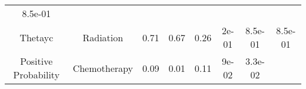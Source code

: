 \documentclass[12pt,]{article}
\begin{document}
\begin{longtable}[]{@{}cccccccc@{}}
\begin{minipage}[t]{0.08\columnwidth}
8.5e-01\strut
\end{minipage}\tabularnewline
\begin{minipage}[t]{0.12\columnwidth}\centering\strut
Thetayc\strut
\end{minipage} & \begin{minipage}[t]{0.11\columnwidth}\centering\strut
Radiation\strut
\end{minipage} & \begin{minipage}[t]{0.13\columnwidth}\centering\strut
0.71\strut
\end{minipage} & \begin{minipage}[t]{0.08\columnwidth}\centering\strut
0.67\strut
\end{minipage} & \begin{minipage}[t]{0.13\columnwidth}\centering\strut
0.26\strut
\end{minipage} & \begin{minipage}[t]{0.07\columnwidth}\centering\strut
2e-01\strut
\end{minipage} & \begin{minipage}[t]{0.06\columnwidth}\centering\strut
8.5e-01\strut
\end{minipage} & \begin{minipage}[t]{0.08\columnwidth}\centering\strut
8.5e-01\strut
\end{minipage}\tabularnewline
\begin{minipage}[t]{0.12\columnwidth}\centering\strut
Positive Probability\strut
\end{minipage} & \begin{minipage}[t]{0.11\columnwidth}\centering\strut
Chemotherapy\strut
\end{minipage} & \begin{minipage}[t]{0.13\columnwidth}\centering\strut
0.09\strut
\end{minipage} & \begin{minipage}[t]{0.08\columnwidth}\centering\strut
0.01\strut
\end{minipage} & \begin{minipage}[t]{0.13\columnwidth}\centering\strut
0.11\strut
\end{minipage} & \begin{minipage}[t]{0.07\columnwidth}\centering\strut
9e-02\strut
\end{minipage} & \begin{minipage}[t]{0.06\columnwidth}\centering\strut
3.3e-02\strut
\end{minipage} & \begin{minipage}[t]{0.08\columnwidth}\centering\strut

\end{minipage}
\end{longtable}
\end{document}
